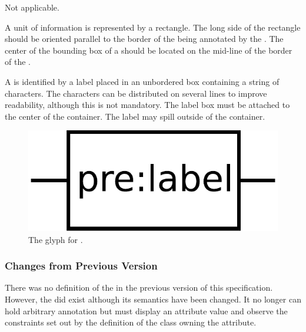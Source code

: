 \begin{glyphDescription}

\glyphSboTerm Not applicable.

\glyphContainer A unit of information is represented by a rectangle.  The long side of the rectangle should be oriented parallel to the border of the  being annotated by the . The center of the bounding box of a  should be located on the mid-line of the border of the .

\glyphLabel A  is identified by a label placed in an unbordered box containing a string of characters.  The characters can be distributed on several lines to improve readability, although this is not mandatory.  The label box must be attached to the center of the container.  The label may spill outside of the container.



\end{glyphDescription}

\begin{figure}[H]
  \centering
  \includegraphics[scale = 0.3]{images/unitInformation}
  \caption{The \PD glyph for .}
  \label{fig:unitInfo}
\end{figure}


\subsubsection{Changes from Previous Version}

There was no definition of the  in the
previous version of this specification. However, the  did exist although its semantics have been changed. It
no longer can hold arbitrary annotation but must display an attribute
value and observe the constraints set out by the definition of the
class owning the attribute.

